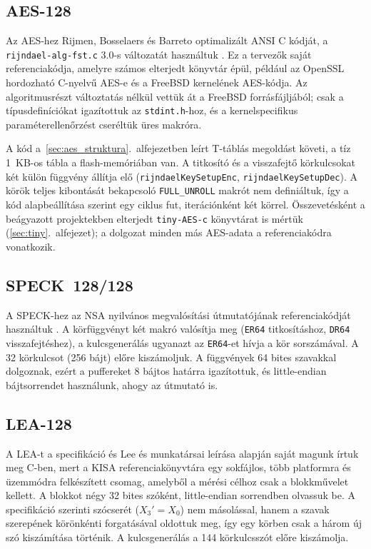\documentclass[a4paper,12pt]{report}
\theoremstyle{definition}
\theoremstyle{remark}
\begin{document}
\subsection{AES-128}

Az AES-hez Rijmen, Bosselaers és Barreto optimalizált ANSI C kódját, a \texttt{rijndael-alg-fst.c} 3.0-s változatát használtuk \cite{RijndaelFst}. Ez a tervezők saját referenciakódja, amelyre számos elterjedt könyvtár épül, például az OpenSSL hordozható C-nyelvű AES-e és a FreeBSD kernelének AES-kódja. Az algoritmusrészt változtatás nélkül vettük át a FreeBSD forrásfájljából; csak a típusdefiníciókat igazítottuk az \texttt{stdint.h}-hoz, és a kernelspecifikus paraméterellenőrzést cseréltük üres makróra.

A kód a~\ref{sec:aes_struktura}.~alfejezetben leírt T-táblás megoldást követi, a tíz 1~KB-os tábla a flash-memóriában van. A titkosító és a visszafejtő körkulcsokat két külön függvény állítja elő (\texttt{rijndaelKeySetupEnc}, \texttt{rijndaelKeySetupDec}). A körök teljes kibontását bekapcsoló \texttt{FULL\_UNROLL} makrót nem definiáltuk, így a kód alapbeállítása szerint egy ciklus fut, iterációnként két körrel. Összevetésként a beágyazott projektekben elterjedt \texttt{tiny-AES-c} könyvtárat \cite{TinyAES} is mértük (\ref{sec:tiny}.~alfejezet); a dolgozat minden más AES-adata a referenciakódra vonatkozik.

\subsection{SPECK~128/128}

A SPECK-hez az NSA nyilvános megvalósítási útmutatójának referenciakódját használtuk \cite{Beaulieu2019}. A körfüggvényt két makró valósítja meg (\texttt{ER64} titkosításhoz, \texttt{DR64} visszafejtéshez), a kulcsgenerálás ugyanazt az \texttt{ER64}-et hívja a kör sorszámával. A 32 körkulcsot (256 bájt) előre kiszámoljuk. A függvények 64 bites szavakkal dolgoznak, ezért a puffereket 8 bájtos határra igazítottuk, és little-endian bájtsorrendet használunk, ahogy az útmutató is.

\subsection{LEA-128}

A LEA-t a specifikáció \cite{Hong2013} és Lee és munkatársai leírása \cite{Lee2014} alapján saját magunk írtuk meg C-ben, mert a KISA referenciakönyvtára egy sokfájlos, több platformra és üzemmódra felkészített csomag, amelyből a mérési célhoz csak a blokkművelet kellett. A blokkot négy 32 bites szóként, little-endian sorrendben olvassuk be. A specifikáció szerinti szócserét ($X_3' = X_0$) nem másolással, hanem a szavak szerepének körönkénti forgatásával oldottuk meg, így egy körben csak a három új szó kiszámítása történik. A kulcsgenerálás a 144 körkulcsszót előre kiszámolja.
\end{document}
